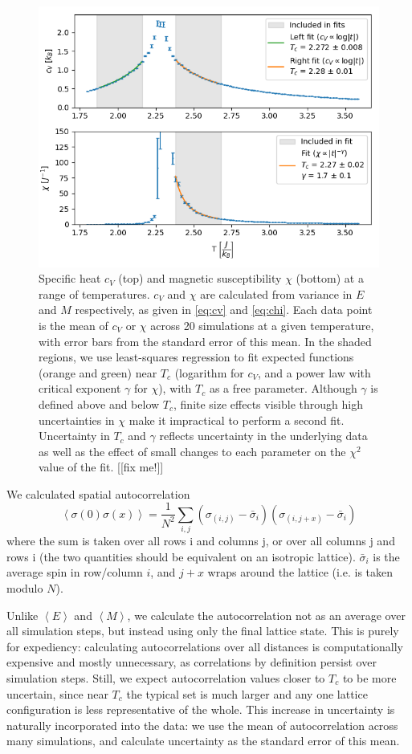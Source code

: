 \documentclass[letter,scriptaddress,twocolumn, prl,nofootinbib]{revtex4}
\newcommand{\submin}[1]{\left\langle #1 \right\rangle}
\begin{document}
\begin{figure}[h]
	\begin{center}
		\includegraphics[width=.5\textwidth]{figs/fig3.png}
		\caption{Specific heat $c_V$ (top) and magnetic susceptibility $\chi$ (bottom) at a range of temperatures. $c_V$ and $\chi$ are calculated from variance in $E$ and $M$ respectively, as given in \autoref{eq:cv} and \autoref{eq:chi}. Each data point is the mean of $c_V$ or $\chi$ across 20 simulations at a given temperature, with error bars from the standard error of this mean. In the shaded regions, we use least-squares regression to fit expected functions (orange and green) near $T_c$ (logarithm for $c_V$, and a power law with critical exponent $\gamma$ for $\chi$), with $T_c$ as a free parameter. Although $\gamma$ is defined above and below $T_c$, finite size effects visible through high uncertainties in $\chi$ make it impractical to perform a second fit. Uncertainty in $T_c$ and $\gamma$ reflects uncertainty in the underlying data as well as the effect of small changes to each parameter on the $\chi^2$ value of the fit. [[fix me!]]}
		\label{fig:fig3}
	\end{center}
\end{figure}

We calculated spatial autocorrelation 
\begin{equation}
	\label{autocor}
	\submin{\sigma(0)\sigma(x)} = \frac{1}{N^2}\sum_{i, j} (\sigma_{(i, j)} - \bar{\sigma}_i)(\sigma_{(i, j + x)} - \bar{\sigma}_i)
\end{equation}
where the sum is taken over all rows i and columns j, or over all columns j and rows i (the two quantities should be equivalent on an isotropic lattice). $\bar{\sigma}_i$ is the average spin in row/column $i$, and $j + x$ wraps around the lattice (i.e. is taken modulo $N$).

Unlike $\submin{E}$ and $\submin{M}$, we calculate the autocorrelation not as an average over all simulation steps, but instead using only the final lattice state. This is purely for expediency: calculating autocorrelations over all distances is computationally expensive and mostly unnecessary, as correlations by definition persist over simulation steps. Still, we expect autocorrelation values closer to $T_c$ to be more uncertain, since near $T_c$ the typical set is much larger and any one lattice configuration is less representative of the whole. This increase in uncertainty is naturally incorporated into the data: we use the mean of autocorrelation across many simulations, and calculate uncertainty as the standard error of this mean.
\end{document}
